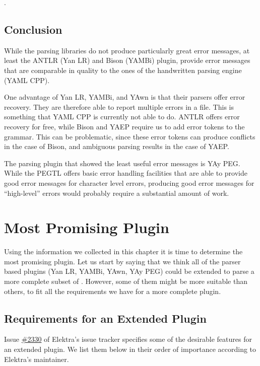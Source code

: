 .

\subsection{Conclusion}

While the parsing libraries do not produce particularly great error messages, at least the ANTLR (Yan LR) and Bison (YAMBi) plugin, provide error messages that are comparable in quality to the ones of the handwritten parsing engine (YAML CPP).

One advantage of Yan LR, YAMBi, and YAwn is that their parsers offer error recovery. They are therefore able to report multiple errors in a file. This is something that YAML CPP is currently not able to do. ANTLR offers error recovery for free, while Bison and YAEP require us to add error tokens to the grammar. This can be problematic, since these error tokens can produce conflicts in the case of Bison, and ambiguous parsing results in the case of YAEP.

The parsing plugin that showed the least useful error messages is YAy PEG. While the PEGTL offers basic error handling facilities that are able to provide good error messages for character level errors, producing good error messages for “high-level” errors would probably require a substantial amount of work.

\section{Most Promising Plugin}

Using the information we collected in this chapter it is time to determine the most promising  plugin. Let us start by saying that we think all of the parser based  plugins (Yan LR, YAMBi, YAwn, YAy PEG) could be extended to parse a more complete subset of . However, some of them might be more suitable than others, to fit all the requirements we have for a more complete  plugin.

\subsection{Requirements for an Extended  Plugin}
\label{sec:requirements_extended_yaml_plugin}

Issue \href{https://issues.libelektra.org/2330}{\#2330} of Elektra’s issue tracker specifies some of the desirable features for an extended  plugin. We list them below in their order of importance according to Elektra’s maintainer.

